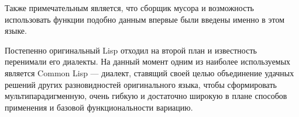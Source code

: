 Также примечательным является, что сборщик мусора и возможность использовать функции подобно данным впервые были введены именно в этом языке. 

Постепенно оригинальный Lisp отходил на второй план и известность перенимали его диалекты. На данный момент одним из наиболее используемых является Common Lisp — диалект, ставящий своей целью объединение удачных решений других разновидностей оригинального языка, чтобы сформировать мультипарадигменную, очень гибкую и достаточно широкую в плане способов применения и базовой функциональности вариацию.